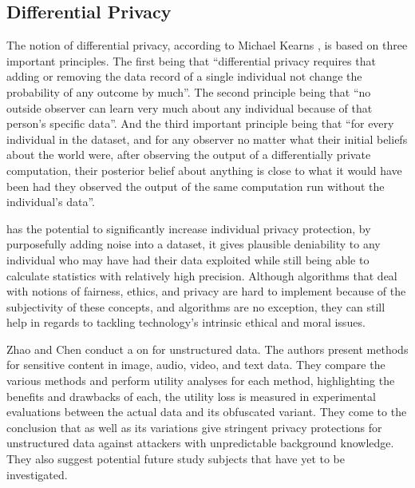 \subsection{Differential Privacy}

The notion of differential privacy, according to Michael Kearns \cite{kearns2019ethical},
is based on three important principles. The first being that ``differential
privacy requires that adding or removing the data record of a single individual
not change the probability of any outcome by much''. The second principle
being that ``no outside observer can learn very much about any individual
because of that person's specific data''. And the third important principle
being that ``for every individual in the dataset, and for any observer no
matter what their initial beliefs about the world were, after observing
the output of a differentially private computation, their posterior belief
about anything is close to what it would have been had they observed the
output of the same computation run without the individual's data''.

\hyperlink{\acronym}{\acronym} has the potential to significantly increase individual
privacy protection, by purposefully adding noise into a dataset, it gives
plausible deniability to any individual who may have had their data exploited
while still being able to calculate statistics with relatively high precision.
Although algorithms that deal with notions of fairness, ethics, and privacy
are hard to implement because of the subjectivity of these concepts, and
\hyperlink{\acronym}{\acronym} algorithms are no exception, they can still help in
regards to tackling technology's intrinsic ethical and moral issues.

Zhao and Chen \cite{ZhaoSurvey} conduct a \hyperlink{\acronym}{\acronym} on \hyperlink{\acronym}{\acronym} for
unstructured data. The authors present \hyperlink{\acronym}{\acronym} methods for
sensitive content in image, audio, video, and text data. They compare the
various methods and perform utility analyses for each method, highlighting
the benefits and drawbacks of each, the utility loss is measured in experimental
evaluations between the actual data and its obfuscated variant. They come
to the conclusion that \hyperlink{\acronym}{\acronym} as well as its variations give
stringent privacy protections for unstructured data against attackers with
unpredictable background knowledge. They also suggest potential future study
subjects that have yet to be investigated.

